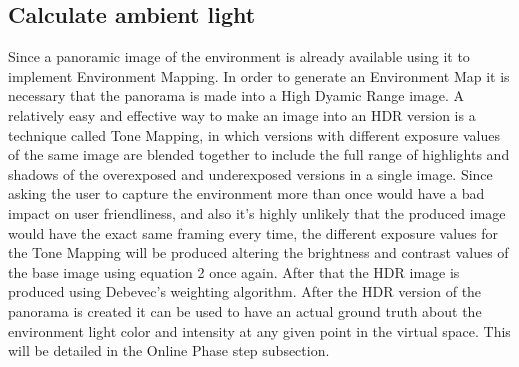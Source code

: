 \subsection{Calculate ambient light}
Since a panoramic image of the environment is already available using it to implement Environment Mapping. In order to generate an Environment Map it is necessary that the panorama is made into a High Dyamic Range image. A relatively easy and effective way to make an image into an HDR version is a technique called Tone Mapping, in which versions with different exposure values of the same image are blended together to include the full range of highlights and shadows of the overexposed and underexposed versions in a single image. Since asking the user to capture the environment more than once would have a bad impact on user friendliness, and also it's highly unlikely that the produced image would have the exact same framing every time, the different exposure values for the Tone Mapping will be produced altering the brightness and contrast values of the base image using equation 2 once again. After that the HDR image is produced using Debevec's weighting algorithm\cite{Debevec}.\newline
After the HDR version of the panorama is created it can be used to have an actual ground truth about the environment light color and intensity at any given point in the virtual space. This will be detailed in the Online Phase step subsection.

